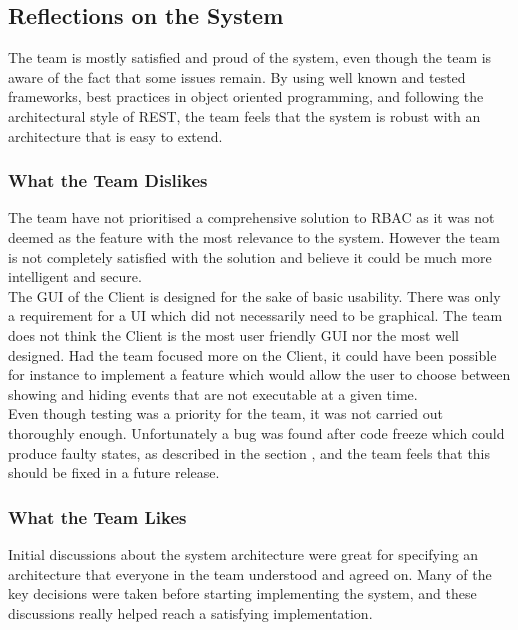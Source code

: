 \subsection{Reflections on the System}
The team is mostly satisfied and proud of the system, even though the team is aware of the fact that some issues remain. By using well known and tested frameworks, best practices in object oriented programming, and following the architectural style of REST, the team feels that the system is robust with an architecture that is easy to extend.

\subsubsection{What the Team Dislikes}
The team have not prioritised a comprehensive solution to RBAC as it was not deemed as the feature with the most relevance to the system. However the team is not completely satisfied with the solution and believe it could be much more intelligent and secure. \\

The GUI of the Client is designed for the sake of basic usability. There was only a requirement for a UI which did not necessarily need to be graphical. The team does not think the Client is the most user friendly GUI nor the most well designed. Had the team focused more on the Client, it could have been possible for instance to implement a feature which would allow the user to choose between showing and hiding events that are not executable at a given time. \\

Even though testing was a priority for the team, it was not carried out thoroughly enough. Unfortunately a bug was found after code freeze which could produce faulty states, as described in the section  , and the team feels that this should be fixed in a future release. \\

\subsubsection{What the Team Likes}
Initial discussions about the system architecture were great for specifying an architecture that everyone in the team understood and agreed on. Many of the key decisions were taken before starting implementing the system, and these discussions really helped reach a satisfying implementation. \\

